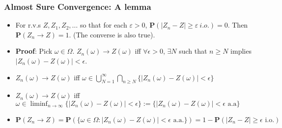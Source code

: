 \documentclass[handout]{beamer}
\newcommand{\BP}{\mathbf{P}}
\begin{document}
\frame
{
  \frametitle{Almost Sure Convergence: A lemma}

   \begin{itemize}
       \item<1->[]
       \begin{Lemma}[5.2.1] 
       For r.v.s $Z, Z_1, Z_2, \ldots $ so that for each $\varepsilon>0$, $\BP(|Z_n-Z| \geq \varepsilon \  i.o.)=0$. Then $\BP(Z_n\rightarrow Z)=1$. (The converse is also true).
       \end{Lemma}       
 
    
\item<2-> \textbf{Proof}: Pick $\omega \in \Omega$. $Z_n(\omega) \rightarrow Z(\omega)$ iff $\forall \epsilon > 0$, $\exists N$ such that $n \ge N$ implies $|Z_n(\omega) - Z(\omega)| < \epsilon$.

\item<3-> $Z_n(\omega) \rightarrow Z(\omega)$ iff $\omega \in \bigcup_{N = 1}^{\infty} \bigcap_{n \ge N} \{|Z_n(\omega) - Z(\omega)| < \epsilon\}$

\item<3-> $Z_n(\omega) \rightarrow Z(\omega)$ iff $\omega \in \liminf_{n \to \infty}\{|Z_n(\omega) - Z(\omega)| < \epsilon\} := \{|Z_n(\omega) - Z(\omega)| < \epsilon \text{ a.a}\}$ 

\item<3-> $\BP(Z_n \rightarrow Z) = \BP(\{ \omega \in \Omega :  |Z_n(\omega) - Z(\omega)| < \epsilon \text{ a.a.}\}) = 1 - \BP(|Z_n - Z| \ge \epsilon \text{ i.o.})$
%        
%        
%        
%               
                              
\end{itemize}
}
\end{document}

